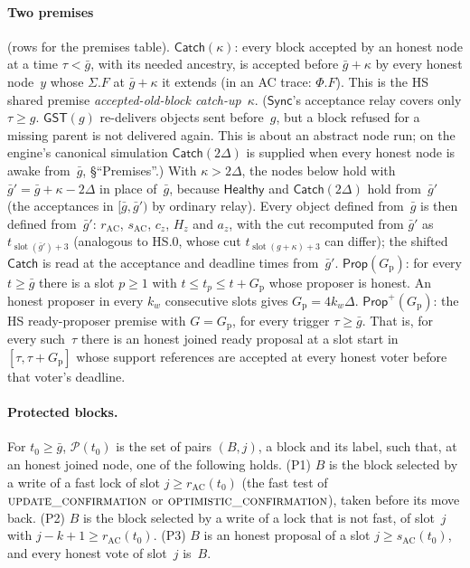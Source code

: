 \documentclass{article}
\newcommand{\slot}{\operatorname{slot}}
\newcommand{\Fr}{\Phi}
\newcommand{\fname}[1]{\text{\textsc{#1}}}
\begin{document}
\paragraph{Two premises} (rows for the premises table).
$\mathsf{Catch}(\kappa)$: every block accepted by an honest node at a time
$\tau<\bar g$, with its needed ancestry, is accepted before $\bar g+\kappa$
by every honest node~$y$ whose $\Sigma.F$ at $\bar g+\kappa$ it extends (in an
AC trace: $\Fr.F$).  This is the HS shared premise
\emph{accepted-old-block catch-up}~$\kappa$.  ($\mathsf{Sync}$'s acceptance
relay covers only $\tau\geq g$.  $\mathsf{GST}(g)$ re-delivers objects sent
before~$g$, but a block refused for a missing parent is not delivered again.
This is about an abstract node run; on the engine's canonical simulation
$\mathsf{Catch}(2\Delta)$ is supplied when every honest node is awake
from~$\bar g$, \S``Premises''.)
With $\kappa>2\Delta$, the nodes below hold with
$\bar g'=\bar g+\kappa-2\Delta$ in place of~$\bar g$, because
$\mathsf{Healthy}$ and $\mathsf{Catch}(2\Delta)$ hold from~$\bar g'$ (the
acceptances in $[\bar g,\bar g')$ by ordinary relay).  Every object defined
from~$\bar g$ is then defined from~$\bar g'$: $r_{\mathrm{AC}}$,
$s_{\mathrm{AC}}$, $c_z$, $H_z$ and $a_z$, with the cut recomputed from
$\bar g'$ as $t_{\slot(\bar g')+3}$ (analogous to HS.0, whose cut
$t_{\slot(g+\kappa)+3}$ can differ); the shifted $\mathsf{Catch}$ is read at
the acceptance and deadline times from~$\bar g'$.
$\mathsf{Prop}(G_{\mathrm p})$: for every $t\geq\bar g$ there is a slot
$p\geq1$ with $t\leq t_p\leq t+G_{\mathrm p}$ whose proposer is honest.  An
honest proposer in every $k_w$ consecutive slots gives
$G_{\mathrm p}=4k_w\Delta$.
$\mathsf{Prop}^{+}(G_{\mathrm p})$: the HS ready-proposer premise with
$G=G_{\mathrm p}$, for every trigger $\tau\geq\bar g$.  That is, for every
such~$\tau$ there is an honest joined ready proposal at a slot start in
$[\tau,\tau+G_{\mathrm p}]$ whose support references are accepted at every
honest voter before that voter's deadline.

\paragraph{Protected blocks.}  For $t_0\geq\bar g$, $\mathcal P(t_0)$ is the
set of pairs $(B,j)$, a block and its label, such that, at an honest joined
node, one of the following holds.
(P1) $B$ is the block selected by a write of a fast lock of slot
$j\geq r_{\mathrm{AC}}(t_0)$ (the fast test of
$\fname{update\_confirmation}$ or $\fname{optimistic\_confirmation}$), taken
before its move back.
(P2) $B$ is the block selected by a write of a lock that is not fast, of
slot~$j$ with $j-k+1\geq r_{\mathrm{AC}}(t_0)$.
(P3) $B$ is an honest proposal of a slot $j\geq s_{\mathrm{AC}}(t_0)$, and
every honest vote of slot~$j$ is~$B$.
\end{document}
